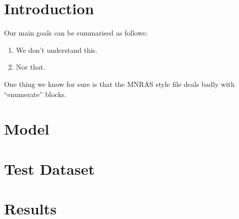 \documentclass[useAMS,usenatbib]{mn2e}
\begin{document}

\section{Introduction}
\label{sec:intro}

Our main goals can be summarised as follows:

\begin{enumerate}

\item We don't understand this.

\item Nor that.

\end{enumerate}

One thing we know for sure is that the MNRAS style file deals badly
with ``enumerate'' blocks.


\section{Model}
\label{sec:model}



\section{Test Dataset}
\label{sec:data}


\section{Results}
\label{sec:results}


\end{document}
